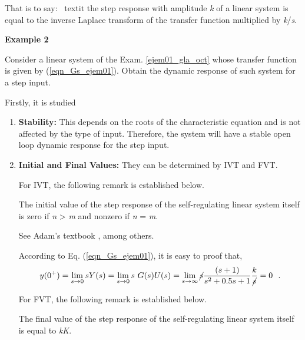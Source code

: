 That is to say: \ textit {the step response with amplitude \textit{k} of a linear system is equal to the inverse Laplace transform of the transfer function multiplied by \textit{k}/\textit{s}.}

\vspace{0.4cm}
\textbf{Example 2} \label{ejem02_gla_oct}

	Consider a linear system of the Exam. \ref{ejem01_gla_oct} whose transfer function is given by (\ref{eqn_Gs_ejem01}). Obtain the dynamic response of such system for a step input.
	
	\vspace{0.4cm}
	Firstly, it is studied
	
	\vspace{0.4cm}
	\begin{enumerate}
		\item \textbf{Stability:} This depends on the roots of the characteristic equation and is not affected by the type of input. Therefore, the system will have a stable open loop dynamic response for the step input.
		\item \textbf{Initial and Final Values:} They can be determined by IVT and FVT. 
		
		For IVT, the following remark is established below.
		
		\begin{remark}
			\begin{remarca}\label{rem03_chp_trans}
				The initial value of the step response of the self-regulating linear system itself is zero if \textit{n} > \textit{m} and nonzero if \textit{n} = \textit{m}.
			\end{remarca}
			
			\begin{demo}
				See Adam's textbook \cite{Adam2018}, among others.
			\end{demo}
		\end{remark}
		
		According to Eq. (\ref{eqn_Gs_ejem01}), it is easy to proof that,
		\begin{equation*} 
			y(0^+)= \lim _{s \to 0} s Y(s) = \lim _{s \to 0} s \ G(s)U(s) =  \lim _{s \to \infty} \cancel{s} \frac{(s+1)}{s^2+0.5s+1} \frac{k}{\cancel{s}} = 0 ~~\mbox{.}
		\end{equation*}
		
		
		For FVT, the following remark is established below.
		
		
		\begin{remark}
			\begin{remarca}\label{rem04_chp_trans}
				The final value of the step response of the self-regulating linear system itself is equal to \textit{kK}.
			\end{remarca}
			

\end{remark}
\end{enumerate}
